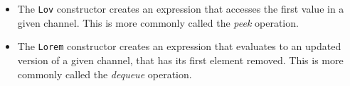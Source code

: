 \begin{itemize}
\begin{itemize}
        \item The \verb|Lov| constructor creates an expression that accesses the first value in a given channel. This is more commonly called the \textit{peek} operation.
        \begin{code}
            \>[4]\AgdaSpace{}%
            \AgdaSymbol{:}\AgdaSpace{}%
            \AgdaSymbol{\{}\AgdaSpace{}%
            \AgdaSymbol{:}\AgdaSpace{}%
            \AgdaSymbol{\}}\AgdaSpace{}%
            \AgdaSpace{}%
            \AgdaSpace{}%
            \AgdaSymbol{(}\AgdaSpace{}%
            \AgdaSymbol{)}\AgdaSpace{}%
            \AgdaSpace{}%
            \AgdaSpace{}%
            \<%
        \end{code}
        
        \item The \verb|Lorem| constructor creates an expression that evaluates to an updated version of a given channel, that has its first element removed. This is more commonly called the \textit{dequeue} operation.
        \begin{code}
            \>[4]\AgdaSpace{}%
            \AgdaSymbol{:}\AgdaSpace{}%
            \AgdaSymbol{\{}\AgdaSpace{}%
            \AgdaSymbol{:}\AgdaSpace{}%
            \AgdaSymbol{\}}\AgdaSpace{}%
            \<%
            \\
            \>[4][@{}l@{\AgdaIndent{0}}]%
            \>[6]\AgdaSpace{}%
            \AgdaSymbol{(}\AgdaSpace{}%
            \AgdaSymbol{)}\AgdaSpace{}%
            \AgdaSpace{}%
            \AgdaSpace{}%
            \AgdaSymbol{(}\AgdaSpace{}%
            \AgdaSymbol{)}\<%
        \end{code}
        

\end{itemize}
\end{itemize}
